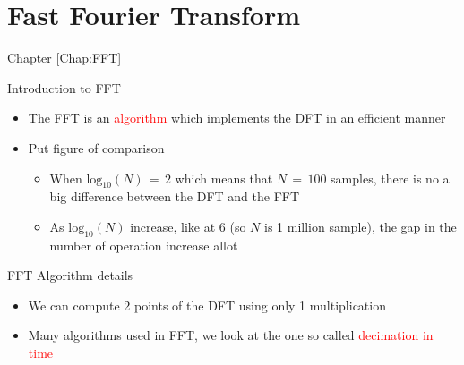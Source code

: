 \documentclass{beamer}
\begin{document}

\section{Fast Fourier Transform}
\label{Chap:FFT}
\begin{frame}[t]{Chapter \autoref{Chap:FFT}}
\tableofcontents[sections= \value{section}]
\end{frame}

\begin{frame}[t,allowframebreaks]{Introduction to FFT}

\begin{itemize}

\item The FFT is an \textcolor{red}{algorithm} which implements the DFT in an efficient manner


\item Put figure of comparison

	\begin{itemize}
	\item When $\text{log}_{10}(N) \, = \, 2$ which means that $N \, = \, 100$ samples, there is no a big difference between the DFT and the FFT
	
	\item As $\text{log}_{10}(N)$ increase, like at 6 (so $N$ is 1 million sample), the gap in the number of operation increase allot 
	\end{itemize}

\end{itemize}


\end{frame}

\begin{frame}[t,allowframebreaks]{FFT Algorithm details}

\begin{itemize}

\item We can compute 2 points of the DFT using only 1 multiplication

\item Many algorithms used in FFT, we look at the one so called \textcolor{red}{decimation in time}


\end{itemize}


\end{frame}
\end{document}
